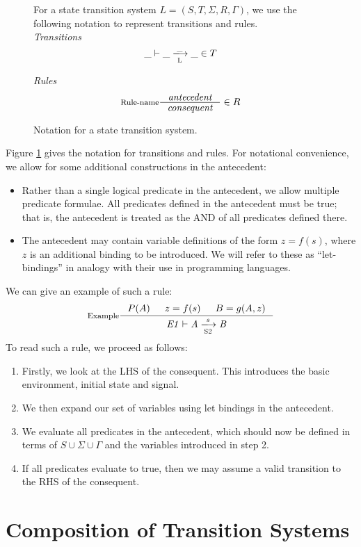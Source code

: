 \documentclass[11pt,a4paper]{article}
\newcommand{\trans}[2]{\xlongrightarrow[\textsc{#1}]{#2}}
\theoremstyle{definition}
\theoremstyle{remark}
\begin{document}
\begin{figure}[h]
  \label{fig:notation}
  For a state transition system $L=(S,T,\Sigma, R, \Gamma)$, we use the
  following notation to represent transitions and rules. \\

  \textit{Transitions}
  \[ \_ \vdash \_ \trans{L}{\_} \_ \in T \]

  \textit{Rules}
  \[ \inference[Rule-name]
     {\textit{antecedent}}
     {\textit{consequent}}
     \in R
  \]
  \caption{Notation for a state transition system.}
\end{figure}
Figure \ref{fig:notation} gives the notation for transitions and rules. For
notational convenience, we allow for some additional constructions in the
antecedent:
\begin{itemize}
  \item Rather than a single logical predicate in the antecedent, we allow
    multiple predicate formulae. All predicates defined in the antecedent must be
    true; that is, the antecedent is treated as the AND of all predicates defined
    there.
  \item The antecedent may contain variable definitions of the form $z=f(s)$,
    where $z$ is an additional binding to be introduced. We will refer to these
    as ``let-bindings'' in analogy with their use in programming languages.
  \end{itemize}
We can give an example of such a rule:
  \[ \inference[Example]
    {P(A) & z = f(s) & B = g(A,z)}
    {\tion[E1]{S2}{A}{s}{B}}
  \]
To read such a rule, we proceed as follows:
\begin{enumerate}
  \item Firstly, we look at the LHS of the consequent. This introduces the basic
    environment, initial state and signal.
  \item We then expand our set of variables using let bindings in the
    antecedent.
  \item We evaluate all predicates in the antecedent, which should now be
    defined in terms of $S\cup\Sigma\cup\Gamma$ and the variables introduced in
    step 2.
  \item If all predicates evaluate to true, then we may assume a valid
    transition to the RHS of the consequent.
\end{enumerate}
\section{Composition of Transition Systems}
\end{document}
